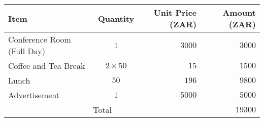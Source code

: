 \documentclass[10pt]{article}
\newcommand{\otoprule}{\midrule[\heavyrulewidth]}
\begin{document}
\begin{center}
    \begin{tabular}{lcrr}
        \toprule
        {\bfseries{Item}} & {\bfseries{Quantity}} & {\bfseries{Unit Price}} (ZAR) & {\bfseries{Amount}} (ZAR)\\
        \otoprule
        Conference Room (Full Day) & $1$ & $3000$ & $3000$\\
        \midrule
        Coffee and Tea Break & $2\times 50$ & $15$ & $1500$\\
        \midrule
        Lunch & $50$ & $196$ & $9800$\\
        \midrule
        Advertisement & $1$ & $5000$ & $5000$\\
	\midrule\midrule
        \multicolumn{3}{c}{Total} & $19300$\\
        \bottomrule
    \end{tabular}
\end{center}
\end{document}
